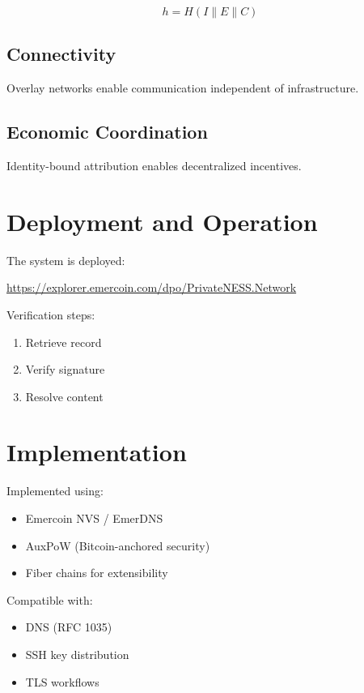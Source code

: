 \documentclass[11pt,a4paper]{article}
\begin{document}
\begin{equation}
h = H(I \parallel E \parallel C)
\end{equation}

\subsection{Connectivity}

Overlay networks enable communication independent of infrastructure.

\subsection{Economic Coordination}

Identity-bound attribution enables decentralized incentives.

\section{Deployment and Operation}

The system is deployed:

\begin{center}
\url{https://explorer.emercoin.com/dpo/PrivateNESS.Network}
\end{center}

Verification steps:

\begin{enumerate}
\item Retrieve record
\item Verify signature
\item Resolve content
\end{enumerate}

\section{Implementation}

Implemented using:

\begin{itemize}
\item Emercoin NVS / EmerDNS
\item AuxPoW (Bitcoin-anchored security)
\item Fiber chains for extensibility
\end{itemize}

Compatible with:

\begin{itemize}
\item DNS (RFC 1035)
\item SSH key distribution
\item TLS workflows
\end{itemize}
\end{document}
